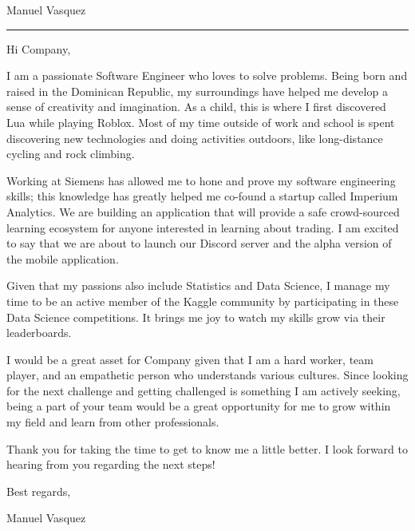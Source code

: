 \documentclass{article}
\newcommand{\position}{I am writing to apply for the \_ position.}
\newcommand{\company}{Company}
\newcommand{\name}{Manuel Vasquez}
\begin{document}
\begin{minipage}[t]{.69\linewidth}
    \vspace*{.555cm}
    {
        \Huge \name
    }

    \vspace*{.7cm}
    \hrule
    \vspace*{.49cm}

    \raggedright

    Hi \company,
    \vspace*{.49cm}


    
    I am a passionate Software Engineer who loves to solve problems. Being born and raised in the Dominican Republic, my surroundings have helped me develop a sense of creativity and imagination. As a child, this is where I first discovered Lua while playing Roblox. Most of my time outside of work and school is spent discovering new technologies and doing activities outdoors, like long-distance cycling and rock climbing.
    \vspace*{.49cm}

    Working at Siemens has allowed me to hone and prove my software engineering skills; this knowledge has greatly helped me co-found a startup called Imperium Analytics. We are building an application that will provide a safe crowd-sourced learning ecosystem for anyone interested in learning about trading. I am excited to say that we are about to launch our Discord server and the alpha version of the mobile application.
    \vspace*{.49cm}

    Given that my passions also include Statistics and Data Science, I manage my time to be an active member of the Kaggle community by participating in these Data Science competitions. It brings me joy to watch my skills grow via their leaderboards.
    \vspace*{.49cm}
    
    I would be a great asset for \company $ $ given that I am a hard worker, team player, and an empathetic person who understands various cultures. Since looking for the next challenge and getting challenged is something I am actively seeking, being a part of your team would be a great opportunity for me to grow within my field and learn from other professionals.
    \vspace*{.49cm}

    Thank you for taking the time to get to know me a little better. I look forward to hearing from you regarding the next steps!
    \vspace*{1cm}

    Best regards,
    \vspace*{.49cm}

    \name
\end{minipage}
\end{document}
